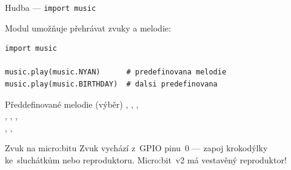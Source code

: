 \begin{frame}[fragile]{Hudba — \texttt{import music}}

  Modul  umožňuje přehrávat zvuky a melodie:

  \bigskip
  \begin{lstlisting}
import music

music.play(music.NYAN)      # predefinovana melodie
music.play(music.BIRTHDAY)  # dalsi predefinovana
  \end{lstlisting}

  \bigskip
  \begin{block}{Předdefinované melodie (výběr)}
    , , ,\\
    , , ,\\
    , , 
  \end{block}

  \bigskip
  \begin{alertblock}{Zvuk na micro:bitu}
    Zvuk vychází z~GPIO pinu~0 — zapoj krokodýlky ke~sluchátkům nebo reproduktoru.
    Micro:bit~v2 má vestavěný reproduktor!
  \end{alertblock}
\end{frame}

